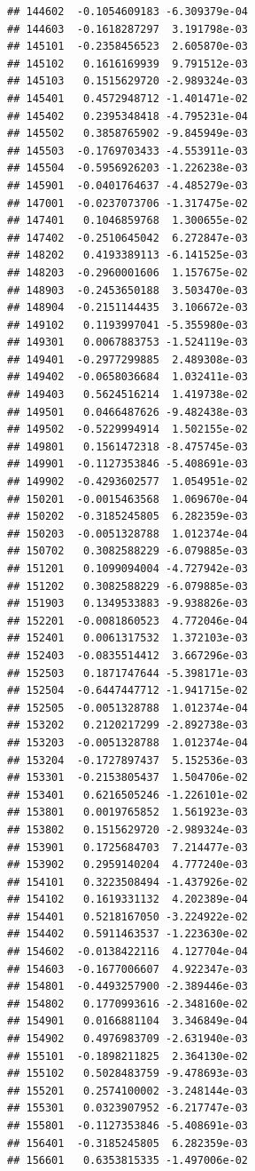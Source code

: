 \begin{frame}[fragile]
\begin{verbatim}
## 144602  -0.1054609183 -6.309379e-04
## 144603  -0.1618287297  3.191798e-03
## 145101  -0.2358456523  2.605870e-03
## 145102   0.1616169939  9.791512e-03
## 145103   0.1515629720 -2.989324e-03
## 145401   0.4572948712 -1.401471e-02
## 145402   0.2395348418 -4.795231e-04
## 145502   0.3858765902 -9.845949e-03
## 145503  -0.1769703433 -4.553911e-03
## 145504  -0.5956926203 -1.226238e-03
## 145901  -0.0401764637 -4.485279e-03
## 147001  -0.0237073706 -1.317475e-02
## 147401   0.1046859768  1.300655e-02
## 147402  -0.2510645042  6.272847e-03
## 148202   0.4193389113 -6.141525e-03
## 148203  -0.2960001606  1.157675e-02
## 148903  -0.2453650188  3.503470e-03
## 148904  -0.2151144435  3.106672e-03
## 149102   0.1193997041 -5.355980e-03
## 149301   0.0067883753 -1.524119e-03
## 149401  -0.2977299885  2.489308e-03
## 149402  -0.0658036684  1.032411e-03
## 149403   0.5624516214  1.419738e-02
## 149501   0.0466487626 -9.482438e-03
## 149502  -0.5229994914  1.502155e-02
## 149801   0.1561472318 -8.475745e-03
## 149901  -0.1127353846 -5.408691e-03
## 149902  -0.4293602577  1.054951e-02
## 150201  -0.0015463568  1.069670e-04
## 150202  -0.3185245805  6.282359e-03
## 150203  -0.0051328788  1.012374e-04
## 150702   0.3082588229 -6.079885e-03
## 151201   0.1099094004 -4.727942e-03
## 151202   0.3082588229 -6.079885e-03
## 151903   0.1349533883 -9.938826e-03
## 152201  -0.0081860523  4.772046e-04
## 152401   0.0061317532  1.372103e-03
## 152403  -0.0835514412  3.667296e-03
## 152503   0.1871747644 -5.398171e-03
## 152504  -0.6447447712 -1.941715e-02
## 152505  -0.0051328788  1.012374e-04
## 153202   0.2120217299 -2.892738e-03
## 153203  -0.0051328788  1.012374e-04
## 153204  -0.1727897437  5.152536e-03
## 153301  -0.2153805437  1.504706e-02
## 153401   0.6216505246 -1.226101e-02
## 153801   0.0019765852  1.561923e-03
## 153802   0.1515629720 -2.989324e-03
## 153901   0.1725684703  7.214477e-03
## 153902   0.2959140204  4.777240e-03
## 154101   0.3223508494 -1.437926e-02
## 154102   0.1619331132  4.202389e-04
## 154401   0.5218167050 -3.224922e-02
## 154402   0.5911463537 -1.223630e-02
## 154602  -0.0138422116  4.127704e-04
## 154603  -0.1677006607  4.922347e-03
## 154801  -0.4493257900 -2.389446e-03
## 154802   0.1770993616 -2.348160e-02
## 154901   0.0166881104  3.346849e-04
## 154902   0.4976983709 -2.631940e-03
## 155101  -0.1898211825  2.364130e-02
## 155102   0.5028483759 -9.478693e-03
## 155201   0.2574100002 -3.248144e-03
## 155301   0.0323907952 -6.217747e-03
## 155801  -0.1127353846 -5.408691e-03
## 156401  -0.3185245805  6.282359e-03
## 156601   0.6353815335 -1.497006e-02

\end{verbatim}
\end{frame}
